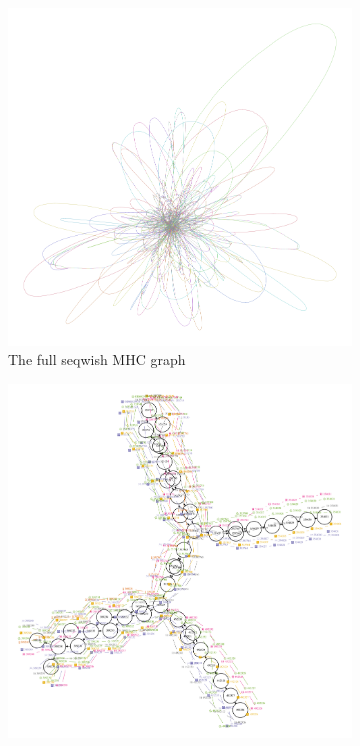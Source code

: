 \begin{figure}[htbp!]
  \begin{subfigure}[t]{0.49\textwidth}
    \includegraphics[width=1.0\textwidth]{Chapter3/Figs/seqwish_MHC.png}
    \caption{The full seqwish MHC graph}
    \label{subfig:seqwish_mhc_bandage}
  \end{subfigure}
  \begin{subfigure}[t]{0.49\textwidth}
    \includegraphics[width=1.0\textwidth]{Chapter3/Figs/seqwish_MHC_n353767_neato.pdf}

\end{subfigure}
\end{figure}
